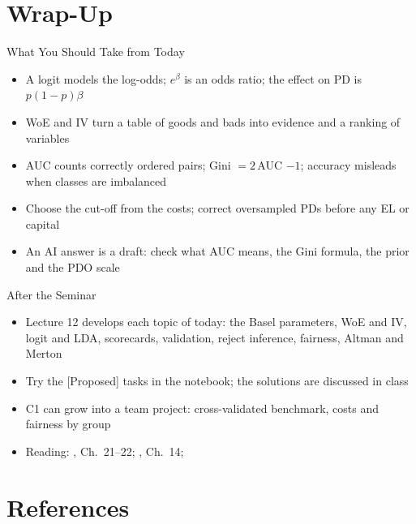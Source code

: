 \section{Wrap-Up}

\begin{frame}{What You Should Take from Today}
\itemsize{\small}
\begin{itemize}
    \item A logit models the log-odds; $e^{\beta}$ is an odds ratio; the effect on PD is $p(1 - p)\beta$
    \item WoE and IV turn a table of goods and bads into evidence and a ranking of variables
    \item AUC counts correctly ordered pairs; Gini $= 2\,$AUC $- 1$; accuracy misleads when classes are imbalanced
    \item Choose the cut-off from the costs; correct oversampled PDs before any EL or capital
    \item An AI answer is a draft: check what AUC means, the Gini formula, the prior and the PDO scale
\end{itemize}
\end{frame}

\begin{frame}{After the Seminar}
\itemsize{\small}
\begin{itemize}
    \item Lecture 12 develops each topic of today: the Basel parameters, WoE and IV, logit and LDA, scorecards, validation, reject inference, fairness, Altman and Merton
    \item Try the [Proposed] tasks in the notebook; the solutions are discussed in class
    \item C1 can grow into a team project: cross-validated benchmark, costs and fairness by group
    \item Reading: , Ch.~21--22; , Ch.~14; 
\end{itemize}
\end{frame}


\section{References}

